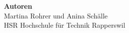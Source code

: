\begin{titlepage}

\begin{adjustwidth}{-25mm}{-45mm}

\begin{adjustwidth}{60mm}{10mm}
\textsf{
	\vspace*{2cm}
	\begin{flushleft}
		\huge \textbf{Temperaturmessung}\\
		\vspace{.25cm}
		\Large Elektronik 2 Projektarbeit\\
	  \end{flushleft}
}
\end{adjustwidth}

\begin{adjustwidth}{35mm}{40mm}	
    \vspace{12cm}
    \large
		\textsf{\textbf{Autoren}}\\
	  \textsf{Martina Rohrer und Anina Schälle}\\
		\textsf{HSR Hochschule für Technik Rapperswil}\\
    \hfill\hbox{}\\
\end{adjustwidth}

\end{adjustwidth}

\newpage								
\thispagestyle{empty}
\mbox{}


\end{titlepage}

